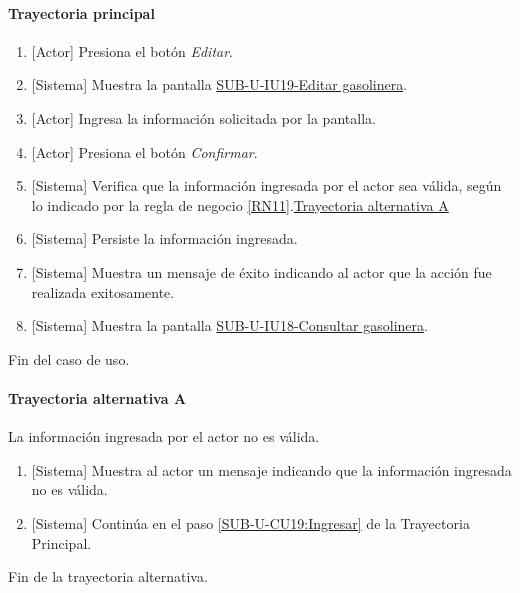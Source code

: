 \paragraph{Trayectoria principal}
	\begin{enumerate}
		\item {[Actor]} Presiona el botón \textit{Editar}.
		\item {[Sistema]} Muestra la pantalla \hyperref[fig:sub-u-iu19]{SUB-U-IU19-Editar gasolinera}.
		\item \label{SUB-U-CU19:Ingresar} {[Actor]} Ingresa la información solicitada por la pantalla.
		\item {[Actor]} Presiona el botón \textit{Confirmar}.
		\item {[Sistema]} Verifica que la información ingresada por el actor sea válida, según lo indicado por la regla de negocio \ref{RN11}.\hyperref[SUB-U-CU19:TA]{Trayectoria alternativa A}
		\item {[Sistema]} Persiste la información ingresada.
		\item {[Sistema]} Muestra un mensaje de éxito indicando al actor que la acción fue realizada exitosamente.
		\item \label{SUB-U-CU19:Pantalla} {[Sistema]} Muestra la pantalla \hyperref[fig:sub-u-iu18]{SUB-U-IU18-Consultar gasolinera}.
	\end{enumerate}
	Fin del caso de uso.

\paragraph{Trayectoria alternativa A} \label{SUB-U-CU19:TA}
	La información ingresada por el actor no es válida.
	\begin{enumerate}[label=A\arabic*.]
		\item {[Sistema]} Muestra al actor un mensaje indicando que la información ingresada no es válida.
		\item {[Sistema]} Continúa en el paso \ref{SUB-U-CU19:Ingresar} de la Trayectoria Principal.
	\end{enumerate}
	Fin de la trayectoria alternativa.

